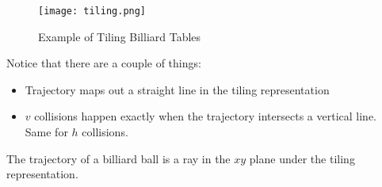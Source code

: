 \begin{figure}
  \texttt{[image: tiling.png]}
  \caption{\label{fig:tiling}Example of Tiling Billiard Tables}
\end{figure}

Notice that there are a couple of things:

\begin{itemize}
  \item Trajectory maps out a straight line in the tiling representation
  \item $v$ collisions happen exactly when the trajectory intersects a vertical line. Same for $h$ collisions.
\end{itemize}

\begin{theorem}
  The trajectory of a billiard ball is a ray in the $xy$ plane under the tiling representation.
\end{theorem}
